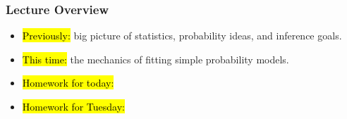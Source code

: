 

\begin{frame}
\frametitle{Lecture Overview}
    \begin{itemize}
    	\item \hl{Previously:} big picture of statistics, probability ideas, and inference goals.
        \item \hl{This time:} the mechanics of fitting simple probability models.
        \item \hl{Homework for today:} 
        \item \hl{Homework for Tuesday:}
        
    \end{itemize}
\end{frame}


    